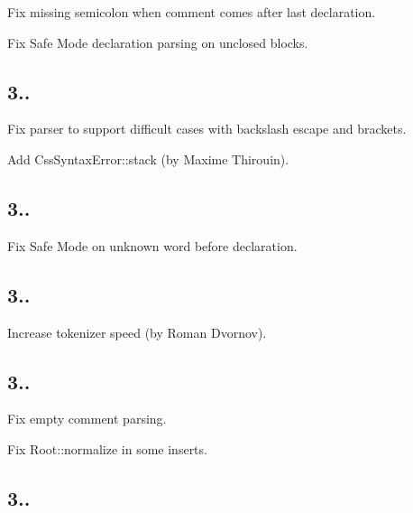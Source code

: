 \begin{DoxyItemize}
\item Fix missing semicolon when comment comes after last declaration.
\item Fix Safe Mode declaration parsing on unclosed blocks.
\end{DoxyItemize}

\subsection*{3..}


\begin{DoxyItemize}
\item Fix parser to support difficult cases with backslash escape and brackets.
\item Add {\ttfamily Css\+Syntax\+Error\+::stack} (by Maxime Thirouin).
\end{DoxyItemize}

\subsection*{3..}


\begin{DoxyItemize}
\item Fix Safe Mode on unknown word before declaration.
\end{DoxyItemize}

\subsection*{3..}


\begin{DoxyItemize}
\item Increase tokenizer speed (by Roman Dvornov).
\end{DoxyItemize}

\subsection*{3..}


\begin{DoxyItemize}
\item Fix empty comment parsing.
\item Fix {\ttfamily Root\+::normalize} in some inserts.
\end{DoxyItemize}

\subsection*{3..}


